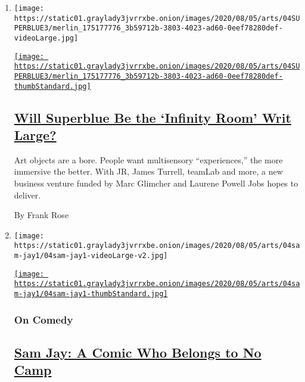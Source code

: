 \begin{enumerate}
\def\labelenumi{\arabic{enumi}.}
\item
  \texttt{[image: https://static01.graylady3jvrrxbe.onion/images/2020/08/05/arts/04SUPERBLUE3/merlin\_175177776\_3b59712b-3803-4023-ad60-0eef78280def-videoLarge.jpg]}

  \href{/2020/08/04/arts/superblue-immersive-art-pace-jobs.html}{\texttt{[image: https://static01.graylady3jvrrxbe.onion/images/2020/08/05/arts/04SUPERBLUE3/merlin\_175177776\_3b59712b-3803-4023-ad60-0eef78280def-thumbStandard.jpg]}}

  \hypertarget{will-superblue-be-the-infinity-room-writ-large}{%
  \subsection{\texorpdfstring{\href{/2020/08/04/arts/superblue-immersive-art-pace-jobs.html}{Will
  Superblue Be the `Infinity Room' Writ
  Large?}}{Will Superblue Be the `Infinity Room' Writ Large?}}\label{will-superblue-be-the-infinity-room-writ-large}}

  Art objects are a bore. People want multisensory ``experiences,'' the
  more immersive the better. With JR, James Turrell, teamLab and more, a
  new business venture funded by Marc Glimcher and Laurene Powell Jobs
  hopes to deliver.

  By Frank Rose
\item
  \texttt{[image: https://static01.graylady3jvrrxbe.onion/images/2020/08/05/arts/04sam-jay1/04sam-jay1-videoLarge-v2.jpg]}

  \href{/2020/08/04/arts/television/sam-jay-netflix-special.html}{\texttt{[image: https://static01.graylady3jvrrxbe.onion/images/2020/08/05/arts/04sam-jay1/04sam-jay1-thumbStandard.jpg]}}

  \hypertarget{on-comedy}{%
  \subsubsection{On Comedy}\label{on-comedy}}

  \hypertarget{sam-jay-a-comic-who-belongs-to-no-camp}{%
  \subsection{\texorpdfstring{\href{/2020/08/04/arts/television/sam-jay-netflix-special.html}{Sam
  Jay: A Comic Who Belongs to No
  Camp}}{Sam Jay: A Comic Who Belongs to No Camp}}\label{sam-jay-a-comic-who-belongs-to-no-camp}}


\end{enumerate}
